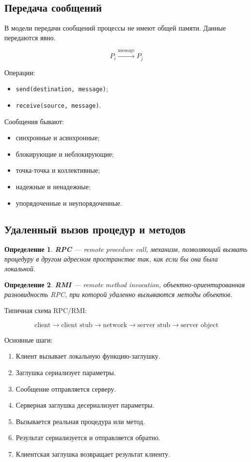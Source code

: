 \documentclass[12pt,a4paper]{article}
\newtheorem{definition}{Определение}
\begin{document}
\subsection{Передача сообщений}

В модели передачи сообщений процессы не имеют общей памяти. Данные передаются явно.

\[
P_i \xrightarrow{\text{message}} P_j
\]

Операции:
\begin{itemize}
    \item \texttt{send(destination, message)};
    \item \texttt{receive(source, message)}.
\end{itemize}

Сообщения бывают:
\begin{itemize}
    \item синхронные и асинхронные;
    \item блокирующие и неблокирующие;
    \item точка-точка и коллективные;
    \item надежные и ненадежные;
    \item упорядоченные и неупорядоченные.
\end{itemize}

\subsection{Удаленный вызов процедур и методов}

\begin{definition}
\textbf{RPC} --- remote procedure call, механизм, позволяющий вызвать процедуру в другом адресном пространстве так, как если бы она была локальной.
\end{definition}

\begin{definition}
\textbf{RMI} --- remote method invocation, объектно-ориентированная разновидность RPC, при которой удаленно вызываются методы объектов.
\end{definition}

Типичная схема RPC/RMI:

\[
\text{client} \rightarrow \text{client stub} \rightarrow \text{network}
\rightarrow \text{server stub} \rightarrow \text{server object}
\]

Основные шаги:
\begin{enumerate}
    \item Клиент вызывает локальную функцию-заглушку.
    \item Заглушка сериализует параметры.
    \item Сообщение отправляется серверу.
    \item Серверная заглушка десериализует параметры.
    \item Вызывается реальная процедура или метод.
    \item Результат сериализуется и отправляется обратно.
    \item Клиентская заглушка возвращает результат клиенту.
\end{enumerate}
\end{document}
